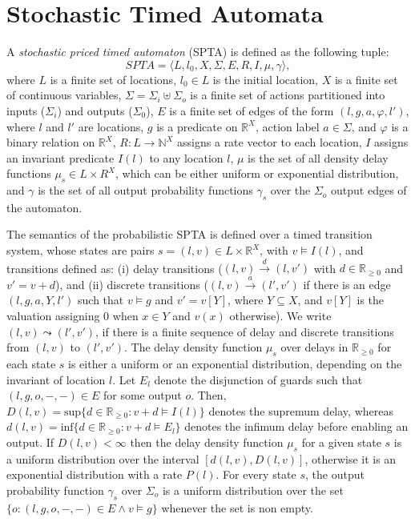 \section*{Stochastic Timed Automata}
A \textit{stochastic priced timed automaton} (SPTA) is defined as the following tuple:
\begin{equation}
SPTA=\langle L, l_0, X, \Sigma, E, R, I, \mu, \gamma \rangle,
\label{eq:STA}
\end{equation}
where
$L$ is a finite set of locations,
$l_0 \in L$ is the initial location,
$X$ is a finite set of continuous variables,
$\Sigma =\Sigma_i \uplus \Sigma_o$ is a finite set of actions partitioned into inputs ($\Sigma_i$) and outputs ($\Sigma_0$),
$E$ is a finite set of edges of the form $(l,g,a,\varphi, l')$, where $l$ and $l'$ are locations, $g$ is a predicate on
$\mathbb{R}^X$, action label $a \in \Sigma$, and $\varphi$ is a binary relation on $\mathbb{R}^X$, $R : L \rightarrow \mathbb{N}^X$ assigns a rate vector to each location,
$I$ assigns an invariant predicate $I(l)$ to any location $l$, $\mu$ is the set of all density delay functions $\mu_s \in L \times R^X$, which can be either uniform or exponential distribution, and $\gamma$ is the set of all output probability functions $\gamma_s$ over the $\Sigma_o$ output edges of the automaton.

The semantics of the probabilistic SPTA is defined over a timed transition system, whose states are pairs $s = (l,v) \in L \times \mathbb{R}^X$, with $v \models I(l)$, and transitions defined as:
(i) delay transitions ($(l, v)\xrightarrow{d}(l, v')$ with $d \in \mathbb{R}_{\geq 0}$ and $v'= v + d$), and
(ii) discrete transitions ($(l, v)\xrightarrow{a}(l', v')$ if there is an edge $(l,g,a,Y,l')$ such that $v \models g$ and $v'= v[Y]$, where $Y \subseteq X$, and $v[Y]$ is the valuation assigning 0 when $x \in Y$ and $v(x)$ otherwise).
We write $(l, v) \leadsto (l', v')$, if there is a finite sequence of delay and discrete transitions from $(l, v)$ to $(l', v')$. 
The delay density function $\mu_s$ over delays in $\mathbb{R}_{\geq 0}$ for each state $s$ is either a uniform or an exponential distribution, depending on the invariant of location $l$. Let $E_l$ denote the disjunction of guards such that $(l, g, o, -, -) \in E$ for some output $o$. Then, $D(l, v) = \mbox{sup}\{d \in \mathbb{R}_{\geq 0} : v + d \models I(l) \}$ denotes the supremum delay, whereas $d(l, v) = \mbox{inf}\{d \in \mathbb{R}_{\geq 0} : v + d \models  E_l \}$ denotes the infimum delay before enabling an output. If $D(l, v) < \infty$ then the delay density function $\mu_s$ for a given state $s$ is a uniform distribution over the interval $[d(l, v), D(l, v)]$, otherwise it is an exponential distribution with a rate $P(l)$. For every state $s$, the output probability function $\gamma_s$ over $\Sigma_o$ is a uniform distribution over the set $\{o : (l, g, o, -, -) \in E \land v \models g\}$ whenever the set is non empty. 

